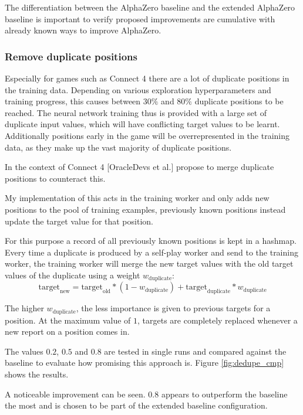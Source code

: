 \documentclass[12pt,onecolumn,oneside,titlepage]{article}
\begin{document}
The differentiation between the AlphaZero baseline and the extended AlphaZero baseline is important to verify proposed improvements are cumulative with already known ways to improve AlphaZero.


\subsubsection{Remove duplicate positions}

Especially for games such as Connect 4 there are a lot of duplicate positions in the training data. Depending on various exploration hyperparameters and training progress, this causes between $30\%$ and $80\%$ duplicate positions to be reached.
The neural network training thus is provided with a large set of duplicate input values, which will have conflicting target values to be learnt. Additionally positions early in the game will be overrepresented in the training data, as they make up the vast majority of
duplicate positions.

In the context of Connect 4 \cite{oracledevs6}[OracleDevs et al.] propose to merge duplicate positions to counteract this.

My implementation of this acts in the training worker and only adds new positions to the pool of training examples, previously known positions instead update the target value
for that position.

For this purpose a record of all previously known positions is kept in a hashmap.
Every time a duplicate is produced by a self-play worker and send to the training worker, the training worker will merge the new target values with the old target values of the duplicate using a weight
$w_{\text{duplicate}}$: $$\text{target}_{\text{new}} = \text{target}_{\text{old}} * (1 - w_{\text{duplicate}}) + \text{target}_{\text{duplicate}} * w_{\text{duplicate}}$$

The higher $w_{\text{duplicate}}$, the less importance is given to previous targets for a position. At the maximum value of $1$,
targets are completely replaced whenever a new report on a position comes in.

The values $0.2$, $0.5$ and $0.8$ are tested in single runs and compared against the baseline to evaluate how promising this approach is. Figure \ref{fig:dedupe_cmp} shows the results. 

A noticeable improvement can be seen. $0.8$ appears to outperform the baseline the most and is chosen to be part of the extended baseline configuration.
\end{document}
